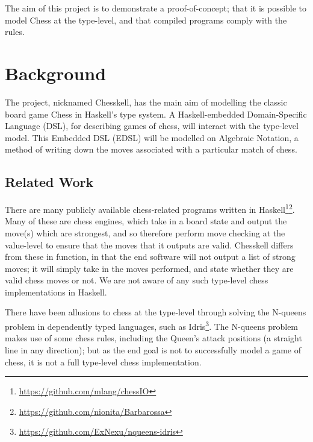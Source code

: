\documentclass[12pt, a4paper]{scrartcl}
\begin{document}
The aim of this project is to demonstrate a proof-of-concept; that it is possible to model Chess at the type-level, and that compiled programs comply with the rules.

\section{Background}

The project, nicknamed Chesskell, has the main aim of modelling the classic board game Chess in Haskell's type system. A Haskell-embedded Domain-Specific Language (DSL), for describing games of chess, will interact with the type-level model. This Embedded DSL (EDSL) will be modelled on Algebraic Notation, a method of writing down the moves associated with a particular match of chess.



\subsection{Related Work}

There are many publicly available chess-related programs written in Haskell\footnote{\url{https://github.com/mlang/chessIO}}\footnote{\url{https://github.com/nionita/Barbarossa}}. Many of these are chess engines, which take in a board state and output the move(s) which are strongest, and so therefore perform move checking at the value-level to ensure that the moves that it outputs are valid. Chesskell differs from these in function, in that the end software will not output a list of strong moves; it will simply take in the moves performed, and state whether they are valid chess moves or not. We are not aware of any such type-level chess implementations in Haskell.

There have been allusions to chess at the type-level through solving the N-queens problem in dependently typed languages, such as Idris\footnote{\url{https://github.com/ExNexu/nqueens-idris}}. The N-queens problem makes use of some chess rules, including the Queen's attack positions (a straight line in any direction); but as the end goal is not to successfully model a game of chess, it is not a full type-level chess implementation.
\end{document}

